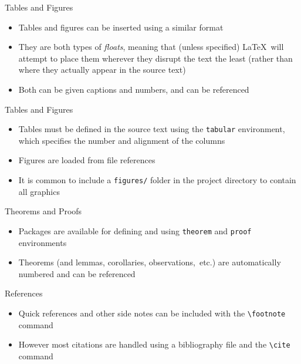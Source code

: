 \documentclass{beamer} %
\begin{document}
\begin{frame}{Tables and Figures}

\begin{itemize}
	\item Tables and figures can be inserted using a similar format
	\item They are both types of \textit{floats}, meaning that (unless specified) \LaTeX\ will attempt to place them wherever they disrupt the text the least (rather than where they actually appear in the source text)
	\item Both can be given captions and numbers, and can be referenced
\end{itemize}

\end{frame}

\begin{frame}{Tables and Figures}

\begin{itemize}
	\item Tables must be defined in the source text using the \texttt{tabular} environment, which specifies the number and alignment of the columns
	\item Figures are loaded from file references
	\item It is common to include a \texttt{figures/} folder in the project directory to contain all graphics
\end{itemize}

\end{frame}

\begin{frame}{Theorems and Proofs}

\begin{itemize}
	\item Packages are available for defining and using \texttt{theorem} and \texttt{proof} environments
	\item Theorems (and lemmas, corollaries, observations,~etc.) are automatically numbered and can be referenced
\end{itemize}

\end{frame}

\begin{frame}{References}

\begin{itemize}
	\item Quick references and other side notes can be included with the {\tt \textbackslash footnote} command
	\item However most citations are handled using a bibliography file and the {\tt \textbackslash cite} command
\end{itemize}

\end{frame}
\end{document}
